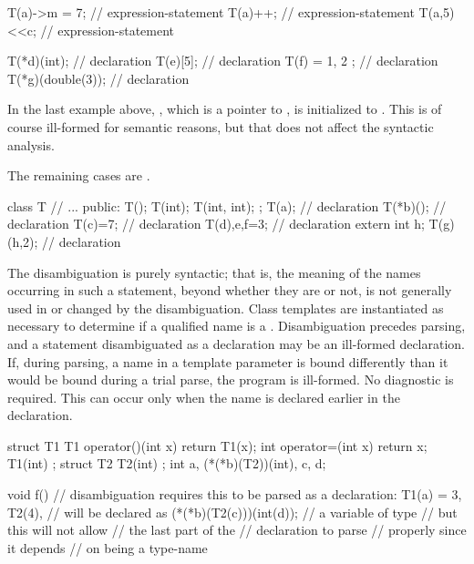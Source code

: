 \begin{codeblock}
T(a)->m = 7;        // expression-statement
T(a)++;             // expression-statement
T(a,5)<<c;          // expression-statement

T(*d)(int);         //  declaration
T(e)[5];            //  declaration
T(f) = { 1, 2 };    //  declaration
T(*g)(double(3));   //  declaration
\end{codeblock}

In the last example above, , which is a pointer to ,
is initialized to . This is of course ill-formed for
semantic reasons, but that does not affect the syntactic analysis.
\exitexample

\pnum
The remaining cases are .
\enterexample

\begin{codeblock}
class T {
  // ...
public:
  T();
  T(int);
  T(int, int);
};
T(a);               //  declaration
T(*b)();            //  declaration
T(c)=7;             //  declaration
T(d),e,f=3;         //  declaration
extern int h;
T(g)(h,2);          //  declaration
\end{codeblock}
\exitexample
\exitnote

\pnum
The disambiguation is purely syntactic; that is, the meaning of the
names occurring in such a statement, beyond whether they are
 or not, is not generally used in or changed by the
disambiguation. Class templates are instantiated as necessary to
determine if a qualified name is a . Disambiguation
precedes parsing, and a statement disambiguated as a declaration may be
an ill-formed declaration. If, during parsing, a name in a template
parameter is bound differently than it would be bound during a trial
parse, the program is ill-formed. No diagnostic is required.
\enternote
This can occur only when the name is declared earlier in the
declaration.
\exitnote
\enterexample

\begin{codeblock}
struct T1 {
  T1 operator()(int x) { return T1(x); }
  int operator=(int x) { return x; }
  T1(int) { }
};
struct T2 { T2(int){ } };
int a, (*(*b)(T2))(int), c, d;

void f() {
  // disambiguation requires this to be parsed as a declaration:
  T1(a) = 3,
  T2(4),                        //  will be declared as
  (*(*b)(T2(c)))(int(d));       // a variable of type 
                                // but this will not allow
                                // the last part of the
                                // declaration to parse
                                // properly since it depends
                                // on  being a type-name
}
\end{codeblock}
\exitexample%
